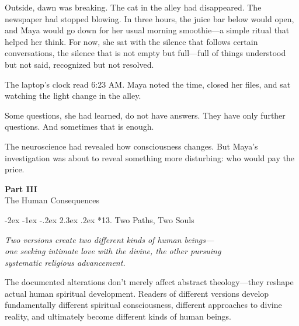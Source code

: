\documentclass[12pt,twoside]{book}
\makeatletter
\def\cleardoublepage{\clearpage\if@twoside \ifodd\c@page\else\hbox{}\thispagestyle{empty}\newpage\if@twocolumn\hbox{}\newpage\fi\fi\fi}
\renewcommand\section{\@startsection{section}{1}{\z@}%
{-2ex \@plus -1ex \@minus -.2ex}%
{2.3ex \@plus.2ex}%
{\normalfont\Large\bfseries}}
\makeatother
\begin{document}
Outside, dawn was breaking. The cat in the alley had disappeared. The newspaper had stopped blowing. In three hours, the juice bar below would open, and Maya would go down for her usual morning smoothie—a simple ritual that helped her think. For now, she sat with the silence that follows certain conversations, the silence that is not empty but full—full of things understood but not said, recognized but not resolved.

The laptop's clock read 6:23 AM. Maya noted the time, closed her files, and sat watching the light change in the alley.

Some questions, she had learned, do not have answers. They have only further questions. And sometimes that is enough.

The neuroscience had revealed how consciousness changes. But Maya's investigation was about to reveal something more disturbing: who would pay the price.

\cleardoublepage
\clearpage
\pagestyle{empty}
\vspace*{0.20\textheight}
\begin{center}
{\Huge\bfseries Part III}\\[0.5cm]
{\Large The Human Consequences}
\end{center}
\vspace*{\fill}
\cleardoublepage
\pagestyle{fancy}
\vspace*{0.20\textheight}
\section*{13. Two Paths, Two Souls}
\thispagestyle{chapterpage}

{\centering\itshape Two versions create two different kinds of human beings—\\one seeking intimate love with the divine, the other pursuing\\systematic religious advancement.\par}
\vspace{0.3cm}

\normalfont\justifying
The documented alterations don't merely affect abstract theology—they reshape actual human spiritual development. Readers of different versions develop fundamentally different spiritual consciousness, different approaches to divine reality, and ultimately become different kinds of human beings.
\end{document}
